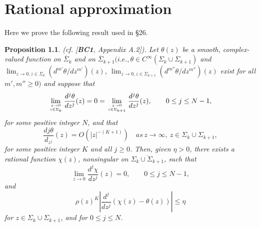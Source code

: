 \documentclass{surv-l}
\theoremstyle{plain}
\newtheorem{prop}[theorem]{Proposition}
\theoremstyle{definition}
\numberwithin{equation}{chapter}
\begin{document}
{\appendix
\renewcommand{\thechapter}{\Alph{chapter}}
\setcounter{chapter}{0}
\chapter{Rational approximation}\label{appA}

Here we prove the following result used in \S26.

\begin{prop}\label{propA.1}
\emph{(cf. [\textbf{BC1}, Appendix A.2])}. Let $\theta(z)$ be a smooth, complex-valued function on $\overline{\Sigma}_{k}$ and on $\overline{\Sigma}_{k+1}(i.e., \theta\in C^{\infty}(\Sigma_{k}\cup\Sigma_{k+1})$ and $\lim_{z\rightarrow 0,z\in\Sigma_{k}}(d^{m'}\theta/dz^{m'})(z)$, $\lim_{z\rightarrow 0,z\in\Sigma_{k+1}}(d^{m''}\theta/dz^{m''})(z)$ exist for all $m',m'' \geq 0)$ and suppose that
\setcounter{equation}{1}
\begin{equation}\label{eqA.2}
\displaystyle\lim_{{z\rightarrow0}\atop{z\in\Sigma_{k}}}\frac{d^{j}\theta}{d{z^{j}}}(z)=0=\lim_{{z\rightarrow0}\atop{z\in\Sigma_{k+1}}}\frac{d^{j}\theta}{d{z^{j}}}(z),\qquad 0\leq j\leq N-1,
\end{equation}
for some positive integer $N$, and that
\begin{equation}\label{eqA.3}
\frac{d{j}\theta}{d_{z^{j}}}(z)=O(|z|^{-(K+1)})\quad as\, z\rightarrow\infty,\ z\in\Sigma_{k}\cup\Sigma_{k+1},
\end{equation}
for some positive integer $K$ and all $j\geq 0$. Then, given $\eta>0$, there exists a rational function $\chi(z)$, nonsingular on $\overline{\Sigma_{k}\cup\Sigma_{k+1}}$, such that
\begin{equation}\label{eqA.4}
\lim_{z\rightarrow 0}\frac{d^{j}\chi}{dz^{j}}(z)=0,\qquad 0\leq j\leq N-1,
\end{equation}
and
\begin{equation}\label{eqA.5}
\rho(z)^{K}\left|\frac{d^{j}}{dz^{j}}(\chi(z)-\theta(z))\right|\leq\eta
\end{equation}
for $z\in\Sigma_{k}\cup\Sigma_{k+1}$, and for $0\leq j \leq N$.
\end{prop}

}
\end{document}
